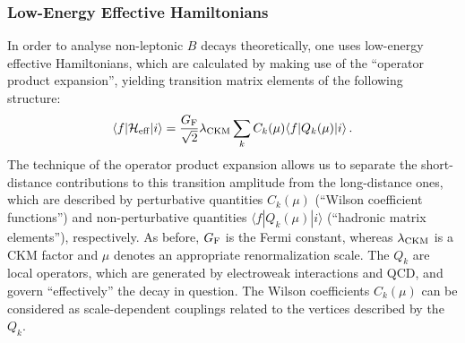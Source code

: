 \documentclass[12pt]{article}
\begin{document}
\subsubsection{Low-Energy Effective Hamiltonians}\label{subsec:ham}
%
%
%
In order to analyse non-leptonic $B$ decays theoretically, one uses 
low-energy effective Hamiltonians, which are calculated by making use 
of the ``operator product expansion'', yielding transition 
matrix elements of the following structure:
\begin{equation}\label{ee2}
\langle f|{\cal H}_{\rm eff}|i\rangle=\frac{G_{\rm F}}{\sqrt{2}}
\lambda_{\rm CKM}\sum_k C_k(\mu)\langle f|Q_k(\mu)|i\rangle\,.
\end{equation}
The technique of the operator product expansion allows us to separate 
the short-distance contributions to this transition amplitude from the 
long-distance ones, which are described by perturbative quantities 
$C_k(\mu)$ (``Wilson coefficient functions'') and non-perturbative 
quantities $\langle f|Q_k(\mu)|i\rangle$ (``hadronic matrix elements''), 
respectively. As before, $G_{\rm F}$ is the Fermi constant, whereas
$\lambda_{\rm CKM}$ is a CKM factor and $\mu$ denotes an appropriate 
renormalization scale. The $Q_k$ are local operators, which 
are generated by electroweak interactions and QCD, and govern ``effectively'' 
the decay in question. The Wilson coefficients $C_k(\mu)$ can be 
considered as scale-dependent couplings related to the vertices described
by the $Q_k$.
\end{document}
